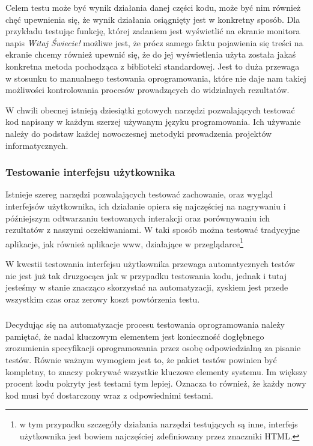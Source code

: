         Celem testu może być wynik działania danej części kodu, może być nim również chęć upewnienia się, że wynik działania osiągnięty jest w konkretny sposób. Dla przykładu testując funkcję, której zadaniem jest wyświetlić na ekranie monitora napis \emph{Witaj Świecie!} możliwe jest, że prócz samego faktu pojawienia się treści na ekranie chcemy również upewnić się, że do jej wyświetlenia użyta została jakaś konkretna metoda pochodząca z biblioteki standardowej. Jest to duża przewaga w stosunku to manualnego testowania oprogramowania, które nie daje nam takiej możliwości kontrolowania procesów prowadzących do widzialnych rezultatów.

        W chwili obecnej istnieją dziesiątki gotowych narzędzi pozwalających testować kod napisany w każdym szerzej używanym języku programowania. Ich używanie należy do podstaw każdej nowoczesnej metodyki prowadzenia projektów informatycznych.
        
      \subsubsection{Testowanie interfejsu użytkownika}
        
        Istnieje szereg narzędzi pozwalających testować zachowanie, oraz wygląd interfejsów użytkownika, ich działanie opiera się najczęściej na nagrywaniu i późniejszym odtwarzaniu testowanych interakcji oraz porównywaniu ich rezultatów z naszymi oczekiwaniami. W taki sposób można testować tradycyjne aplikacje, jak również aplikacje www, działające w przeglądarce\footnote{w tym  przypadku szczegóły działania narzędzi testujących są inne, interfejs użytkownika jest bowiem najczęściej zdefiniowany przez znaczniki HTML.}
        
        W kwestii testowania interfejsu użytkownika przewaga automatycznych testów nie jest już tak druzgocąca jak w przypadku testowania kodu, jednak i tutaj jesteśmy w stanie znacząco skorzystać na automatyzacji, zyskiem jest przede wszystkim czas oraz zerowy koszt powtórzenia testu.
        
      \subsubsection{}

        Decydując się na automatyzacje procesu testowania oprogramowania należy pamiętać, że nadal kluczowym elementem jest konieczność dogłębnego zrozumienia specyfikacji oprogramowania przez osobę odpowiedzialną za pisanie testów. Równie ważnym wymogiem jest to, że pakiet testów powinien być kompletny, to znaczy pokrywać wszystkie kluczowe elementy systemu. Im większy procent kodu pokryty jest testami tym lepiej. Oznacza to również, że każdy nowy kod musi być dostarczony wraz z odpowiednimi testami.
        
